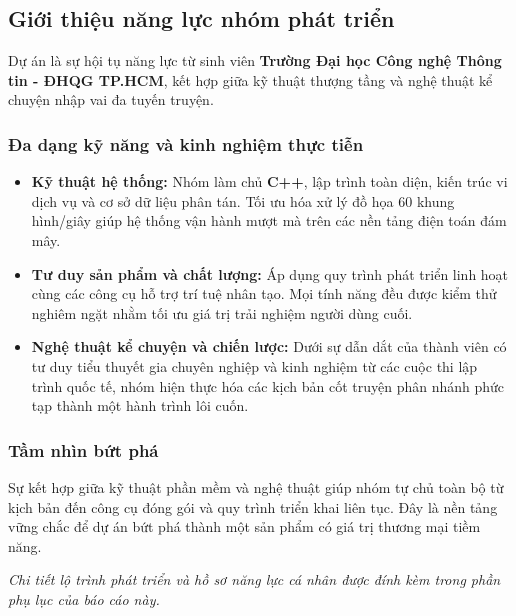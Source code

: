 \documentclass[12pt,a4paper]{article}
\begin{document}
\subsection{Giới thiệu năng lực nhóm phát triển}
Dự án là sự hội tụ năng lực từ sinh viên \textbf{Trường Đại học Công nghệ Thông tin - ĐHQG TP.HCM}, kết hợp giữa kỹ thuật thượng tầng và nghệ thuật kể chuyện nhập vai đa tuyến truyện.

\subsubsection*{Đa dạng kỹ năng và kinh nghiệm thực tiễn}
\begin{itemize}
    \item \textbf{Kỹ thuật hệ thống:} Nhóm làm chủ \textbf{C++}, lập trình toàn diện, kiến trúc vi dịch vụ và cơ sở dữ liệu phân tán. Tối ưu hóa xử lý đồ họa 60 khung hình/giây giúp hệ thống vận hành mượt mà trên các nền tảng điện toán đám mây.
    \item \textbf{Tư duy sản phẩm và chất lượng:} Áp dụng quy trình phát triển linh hoạt cùng các công cụ hỗ trợ trí tuệ nhân tạo. Mọi tính năng đều được kiểm thử nghiêm ngặt nhằm tối ưu giá trị trải nghiệm người dùng cuối.
    \item \textbf{Nghệ thuật kể chuyện và chiến lược:} Dưới sự dẫn dắt của thành viên có tư duy tiểu thuyết gia chuyên nghiệp và kinh nghiệm từ các cuộc thi lập trình quốc tế, nhóm hiện thực hóa các kịch bản cốt truyện phân nhánh phức tạp thành một hành trình lôi cuốn.
\end{itemize}

\subsubsection*{Tầm nhìn bứt phá}
Sự kết hợp giữa kỹ thuật phần mềm và nghệ thuật giúp nhóm tự chủ toàn bộ từ kịch bản đến công cụ đóng gói và quy trình triển khai liên tục. Đây là nền tảng vững chắc để dự án bứt phá thành một sản phẩm có giá trị thương mại tiềm năng.

\vspace{1.5em}
\begin{center}
    \textit{\small Chi tiết lộ trình phát triển và hồ sơ năng lực cá nhân được đính kèm trong phần phụ lục của báo cáo này.}
\end{center}

\label{LastPagePreface}
\end{document}
